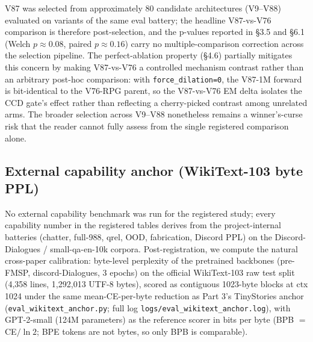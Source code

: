 \documentclass[11pt]{article}
\begin{document}
V87 was selected from approximately 80 candidate architectures (V9--V88) evaluated on variants of the same eval battery; the headline V87-vs-V76 comparison is therefore post-selection, and the p-values reported in \S3.5 and \S6.1 (Welch $p \approx 0.08$, paired $p \approx 0.16$) carry no multiple-comparison correction across the selection pipeline. The perfect-ablation property (\S4.6) partially mitigates this concern by making V87-vs-V76 a controlled mechanism contrast rather than an arbitrary post-hoc comparison: with \texttt{force\_dilation=0}, the V87-1M forward is bit-identical to the V76-RPG parent, so the V87-vs-V76 EM delta isolates the CCD gate's effect rather than reflecting a cherry-picked contrast among unrelated arms. The broader selection across V9--V88 nonetheless remains a winner's-curse risk that the reader cannot fully assess from the single registered comparison alone.

\subsection{External capability anchor (WikiText-103 byte PPL)}

No external capability benchmark was run for the registered study; every capability number in the registered tables derives from the project-internal batteries (chatter, full-988, qrel, OOD, fabrication, Discord PPL) on the Discord-Dialogues / small-qa-en-10k corpora. Post-registration, we compute the natural cross-paper calibration: byte-level perplexity of the pretrained backbones (pre-FMSP, discord-Dialogues, 3 epochs) on the official WikiText-103 raw test split (4,358 lines, 1,292,013 UTF-8 bytes), scored as contiguous 1023-byte blocks at ctx 1024 under the same mean-CE-per-byte reduction as Part 3's TinyStories anchor (\texttt{eval\_wikitext\_anchor.py}; full log \texttt{logs/eval\_wikitext\_anchor.log}), with GPT-2-small (124M parameters) as the reference scorer in bits per byte (BPB $=$ CE$/\ln 2$; BPE tokens are not bytes, so only BPB is comparable).
\end{document}

